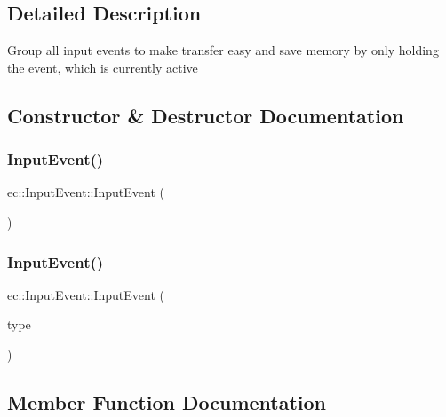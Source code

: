\subsection{Detailed Description}
Group all input events to make transfer easy and save memory by only holding the event, which is currently active 

\subsection{Constructor \& Destructor Documentation}
\mbox{\label{structec_1_1_input_event_a0e1dd98eb4e1161bdb573afe429d07c8}} 
\subsubsection{\texorpdfstring{Input\+Event()}{InputEvent()}\hspace{0.1cm}{\footnotesize\ttfamily [1/2]}}
{\footnotesize\ttfamily ec\+::\+Input\+Event\+::\+Input\+Event (\begin{DoxyParamCaption}{ }\end{DoxyParamCaption})\hspace{0.3cm}{\ttfamily [explicit]}}

\mbox{\label{structec_1_1_input_event_af8894b724a61a63412f4e6df14a49d7a}} 
\subsubsection{\texorpdfstring{Input\+Event()}{InputEvent()}\hspace{0.1cm}{\footnotesize\ttfamily [2/2]}}
{\footnotesize\ttfamily ec\+::\+Input\+Event\+::\+Input\+Event (\begin{DoxyParamCaption}\item[{\mbox{\hyperlink{namespaceec_ae2d697393ea83b34b18ab14eb5dacbca}{Input\+Type}}}]{type }\end{DoxyParamCaption})\hspace{0.3cm}{\ttfamily [explicit]}}



\subsection{Member Function Documentation}
\mbox{\label{structec_1_1_input_event_a778cd0afc60db1b127585a54c61b9e75}} 
